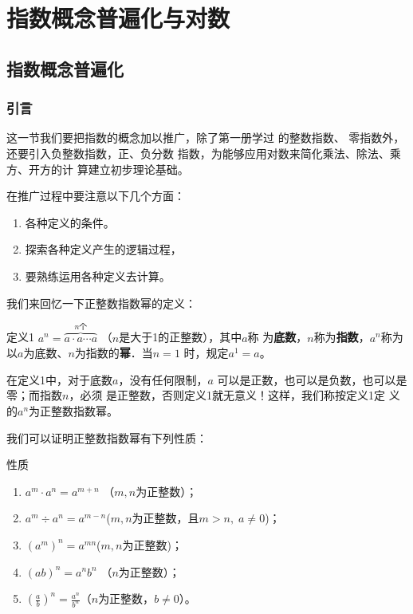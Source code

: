 \chapter{指数概念普遍化与对数}

\section{指数概念普遍化}
\subsection{引言}
这一节我们要把指数的概念加以推广，除了第一册学过
的整数指数、
零指数外，还要引入负整数指数，正、负分数
指数，为能够应用对数来简化乘法、除法、乘方、开方的计
算建立初步理论基础。

在推广过程中要注意以下几个方面：
\begin{enumerate}
\item 各种定义的条件。
\item 探索各种定义产生的逻辑过程，
\item 要熟练运用各种定义去计算。
\end{enumerate}


我们来回忆一下正整数指数幂的定义：

\begin{blk}{定义1}
$a^n=\overbrace{a\cdot a\cdots a}^{\text{$n$个}}$ （$n$是大于1的正整数），其中$a$称
为\textbf{底数}，$n$称为\textbf{指数}，$a^n$称为以$a$为底数、$n$为指数的\textbf{幂}．当$n=1$
时，规定$a^1=a$。
\end{blk}

在定义1中，对于底数$a$，没有任何限制，$a$
可以是正数，也可以是负数，也可以是零；而指数$n$，必须
是正整数，否则定义1就无意义！这样，我们称按定义1定
义的$a^n$为正整数指数幂。

我们可以证明正整数指数幂有下列性质：
\begin{blk}{性质}
\begin{enumerate}
    \item $a^m\cdot a^n=a^{m+n}$ \quad （$m,n$为正整数）；
    \item $a^m\div a^n=a^{m-n}$\quad ($m,n$为正整数，且$m>n,\; a\ne 0$)；
    \item $(a^m)^n=a^{mn}$\quad ($m,n$为正整数)；
    \item $(ab)^n=a^nb^n$ \quad（$n$为正整数）；
    \item $\left(\frac{a}{b}\right)^n=\frac{a^n}{b^n}$\quad （$n$为正整数，$b\ne 0$）。
\end{enumerate}
\end{blk}

